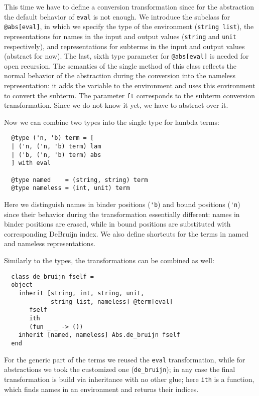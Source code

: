 \documentclass[submission,copyright,creativecommons]{eptcs}
\newcommand{\cd}[1]{\texttt{#1}}
\begin{document}
This time we have to define a conversion transformation since for the abstraction the default behavior of \cd{eval} is not
enough. We introduce the subclass for \cd{@abs[eval]}, in which we specify the type of the environment (\lstinline{string list}),
the representations for names in the input and output values (\lstinline{string} and \lstinline{unit} respectively), and
representations for subterms in the input and output values (abstract for now). The last, sixth type parameter for \cd{@abs[eval]}
is needed for open recursion. The semantics of the single method of this class reflects the normal behavior of the
abstraction during the conversion into the nameless representation: it adds the variable to the environment and uses this
environment to convert the subterm. The parameter \lstinline{ft} corresponds to the subterm conversion transformation. Since
we do not know it yet, we have to abstract over it.

Now we can combine two types into the single type for lambda terms:

\begin{lstlisting}
  @type ('n, 'b) term = [
  | ('n, ('n, 'b) term) lam
  | ('b, ('n, 'b) term) abs
  ] with eval

  @type named    = (string, string) term
  @type nameless = (int, unit) term
\end{lstlisting}

Here we distinguish names in binder positions (\lstinline{'b}) and bound positions (\lstinline{'n}) since their behavior during the
transformation essentially different: names in binder positions are erased, while in bound positions are substituted with corresponding
DeBruijn index. We also define shortcuts for the terms in named and nameless representations.

Similarly to the types, the transformations can be combined as well:

\begin{lstlisting}
  class de_bruijn fself =
  object
    inherit [string, int, string, unit,
             string list, nameless] @term[eval]
       fself
       ith
       (fun _ _ -> ())
    inherit [named, nameless] Abs.de_bruijn fself
  end
\end{lstlisting}

For the generic part of the terms we reused the \cd{eval} transformation, while for abstractions we took the customized one (\lstinline{de_bruijn}); in
any case the final transformation is build via inheritance with no other glue; here \lstinline{ith} is a function, which finds names in an
environment and returns their indices.
\end{document}
